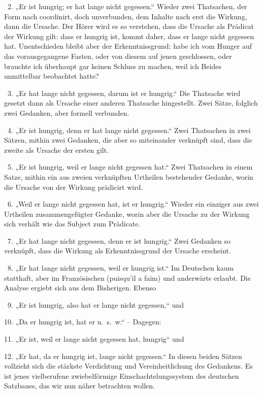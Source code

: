 ~2. „Er ist hungrig; er hat lange nicht gegessen.“ Wieder zwei Thatsachen, der Form nach coordinirt, doch unverbunden, dem Inhalte nach erst die Wirkung, dann die Ursache. Der Hörer wird es so verstehen, dass die Ursache als Prädicat der Wirkung gilt: dass er hungrig ist, kommt daher, dass er lange nicht gegessen hat. Unentschieden bleibt aber der Erkenntnissgrund: habe ich vom Hunger auf das vorausge\label{fp.428}gangene Fasten, oder von diesem auf jenen geschlossen, oder brauchte ich überhaupt gar keinen Schluss zu machen, weil ich Beides unmittelbar beobachtet hatte?

~3. „Er hat lange nicht gegessen, darum ist er hungrig.“ Die Thatsache wird gesetzt dann als Ursache einer anderen Thatsache hingestellt. Zwei Sätze, folglich zwei Gedanken, aber formell verbunden.

~4. „Er ist hungrig, denn er hat lange nicht gegessen.“ Zwei Thatsachen in zwei Sätzen, mithin zwei Gedanken, die aber so miteinander verknüpft sind, dass die zweite als Ursache der ersten gilt.

~5. „Er ist hungrig, weil er lange nicht gegessen hat.“ Zwei Thatsachen in einem Satze, mithin ein aus zweien verknüpften Urtheilen bestehender Gedanke, worin die Ursache von der Wirkung prädicirt wird.

\label{sp.449}

~6. „Weil er lange nicht gegessen hat, ist er hungrig.“ Wieder ein einziger aus zwei Urtheilen zusammengefügter Gedanke, worin aber die Ursache zu der Wirkung sich verhält wie das Subject zum Prädicate.

~7. „Er hat lange nicht gegessen, denn er ist hungrig.“ Zwei Gedanken so verknüpft, dass die Wirkung als Erkenntnissgrund der Ursache erscheint.

~8. „Er hat lange nicht gegessen, weil er hungrig ist.“ Im Deutschen kaum statthaft, aber im Französischen (puisqu’il a faim) und anderwärts erlaubt. Die Analyse ergiebt sich aus dem Bisherigen. Ebenso

~9. „Er ist hungrig, also hat er lange nicht gegessen,“ und

10. „Da er hungrig ist, hat er u.~s.~w.“ – Dagegen:

11. „Er ist, weil er lange nicht gegessen hat, hungrig“ und

12. „Er hat, da er hungrig ist, lange nicht gegessen.“ In diesen beiden Sätzen vollzieht sich die stärkste Verdichtung und Vereinheitlichung des Gedankens. Es ist jenes vielberufene zwiebelförmige Einschachtelungssystem des deutschen Satzbaues, das wir nun näher betrachten wollen.

